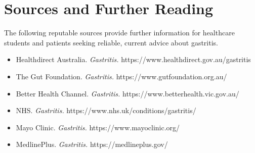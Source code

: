 \section*{Sources and Further Reading}
The following reputable sources provide further information for healthcare students and patients seeking reliable, current advice about gastritis.
\begin{itemize}
    \item Healthdirect Australia. \textit{Gastritis.} https://www.healthdirect.gov.au/gastritis
    \item The Gut Foundation. \textit{Gastritis.} https://www.gutfoundation.org.au/
    \item Better Health Channel. \textit{Gastritis.} https://www.betterhealth.vic.gov.au/
    \item NHS. \textit{Gastritis.} https://www.nhs.uk/conditions/gastritis/
    \item Mayo Clinic. \textit{Gastritis.} https://www.mayoclinic.org/
    \item MedlinePlus. \textit{Gastritis.} https://medlineplus.gov/
\end{itemize}
